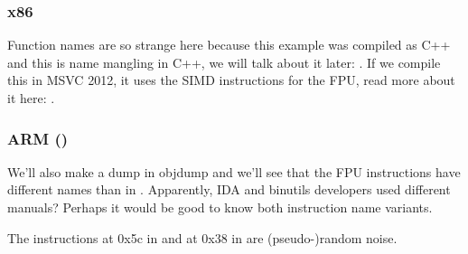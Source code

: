 \subsubsection{x86}



Function names are so strange here because this example was compiled as C++ and this is name mangling in C++,
we will talk about it later: .
If we compile this in MSVC 2012, it uses the SIMD instructions for the FPU, read more about it here: .

\iffalse
A BUG HERE
\subsubsection{MIPS}



There is also an useless \INS{LUI} instruction added for some weird reason.
We considered this artifact earlier: \myref{MIPS_FPU_LUI}.
\fi

\subsubsection{ARM (\ARMMode)}




We'll also make a dump in objdump and we'll see that the FPU instructions have different names than in \IDA.
Apparently, IDA and binutils developers used different manuals?
Perhaps it would be good to know both instruction name variants.



The instructions at 0x5c in  and at 0x38 in \main are (pseudo-)random noise.

